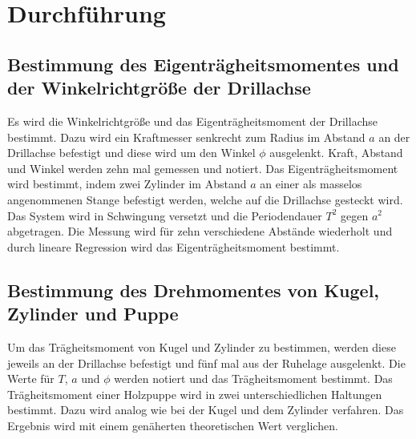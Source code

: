 
\section{Durchführung}
\label{sec:Durchführung}

\subsection{Bestimmung des Eigenträgheitsmomentes und der Winkelrichtgröße der Drillachse}
Es wird die Winkelrichtgröße und das Eigenträgheitsmoment der Drillachse bestimmt. Dazu wird ein Kraftmesser senkrecht zum Radius im Abstand $a$ an der Drillachse befestigt und diese wird um den Winkel $\phi$ ausgelenkt. Kraft, Abstand und Winkel werden zehn mal gemessen und notiert.\newline
Das Eigenträgheitsmoment wird bestimmt, indem zwei Zylinder im Abstand $a$ an einer als masselos angenommenen Stange befestigt werden, welche auf die Drillachse gesteckt wird. Das System wird in Schwingung versetzt und die Periodendauer $T^2$ gegen $a^2$ abgetragen. Die Messung wird für zehn verschiedene Abstände wiederholt und durch lineare Regression wird das Eigenträgheitsmoment bestimmt.   

\subsection{Bestimmung des Drehmomentes von Kugel, Zylinder und Puppe}
Um das Trägheitsmoment von Kugel und Zylinder zu bestimmen, werden diese jeweils an der Drillachse befestigt und fünf mal aus der Ruhelage ausgelenkt. Die Werte für $T$, $a$ und $\phi$ werden notiert und das Trägheitsmoment bestimmt. \newline
Das Trägheitsmoment einer Holzpuppe wird in zwei unterschiedlichen Haltungen bestimmt. Dazu wird analog wie bei der Kugel und dem Zylinder verfahren. Das Ergebnis wird mit einem genäherten theoretischen Wert verglichen.   